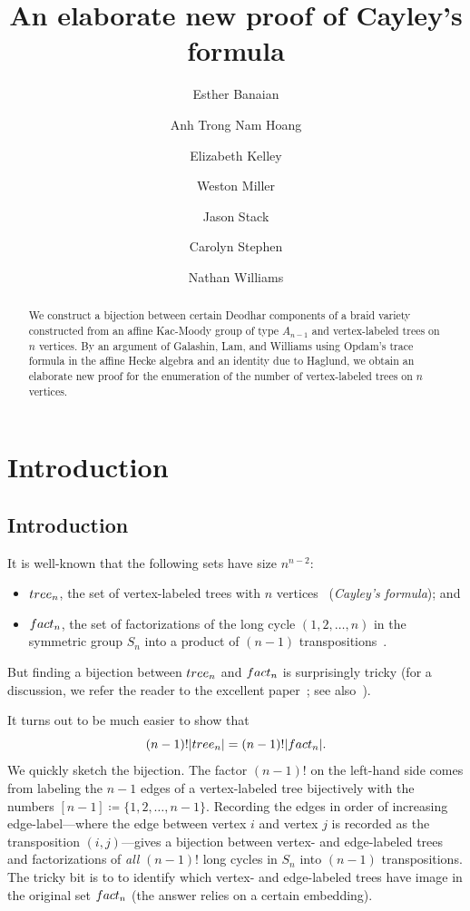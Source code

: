 \documentclass[a4paper,10pt,leqno]{amsart}
\title[An elaborate new proof of Cayley's formula]{An elaborate new proof of Cayley's formula}%
\author[Banaian]{Esther Banaian}
\author[Hoang]{Anh Trong Nam Hoang}
\author[Kelley]{Elizabeth Kelley}
\author[Miller]{Weston Miller}
\author[Stack]{Jason Stack}
\author[Stephen]{Carolyn Stephen}
\author[Williams]{Nathan Williams}
\newcommand{\darkred}{\color{darkred}}
\numberwithin{equation}{section}
\theoremstyle{definition}
\theoremstyle{remark}
\newcommand{\T}{\textsc{tree}}
\newcommand{\F}{\textsc{fact}}
\newcommand{\defn}[1]{\emph{\darkred #1}}
\begin{document}
\begin{abstract}
We construct a bijection between certain Deodhar components of a braid variety constructed from an affine Kac-Moody group of type $A_{n-1}$ and vertex-labeled trees on $n$ vertices.   By an argument of Galashin, Lam, and Williams using Opdam's trace formula in the affine Hecke algebra and an identity due to Haglund, we obtain an elaborate new proof for the enumeration of the number of vertex-labeled trees on $n$ vertices.
\end{abstract}

\maketitle

\section{Introduction}
\label{sec:introduction}
\subsection{Introduction}
\label{sec:history}

It is well-known that the following sets have size $n^{n-2}$:
\begin{itemize}
 \item $\T_n$, the set of vertex-labeled trees with $n$ vertices~\cite{cayley} (\defn{Cayley's formula}); and
 \item $\F_n$, the set of factorizations of the long cycle $(1,2,\ldots,n)$ in the symmetric group $S_n$ into a product of $(n-1)$ transpositions~\cite{goulden1997transitive}.
\end{itemize}


But finding a bijection between $\T_n$ and $\F_n$ is surprisingly tricky (for a discussion, we refer the reader to the excellent paper~\cite{goulden2002tree}; see also~\cite{stanley1997parking}).

It turns out to be much easier to show that \[(n-1)!|\T_n|=(n-1)!|\F_n|.\] We quickly sketch the bijection.  The factor $(n-1)!$ on the left-hand side comes from labeling the $n-1$ edges of a vertex-labeled tree bijectively with the numbers $[n-1]\coloneqq\{1,2,\ldots,n-1\}$.  Recording the edges in order of increasing edge-label---where the edge between vertex $i$ and vertex $j$ is recorded as the transposition $(i,j)$---gives a bijection between vertex- and edge-labeled trees and factorizations of \emph{all} $(n-1)!$ long cycles in $S_n$ into $(n-1)$ transpositions.  The tricky bit is to to identify which vertex- and edge-labeled trees have image in the original set $\F_n$ (the answer relies on a certain embedding).
\end{document}

